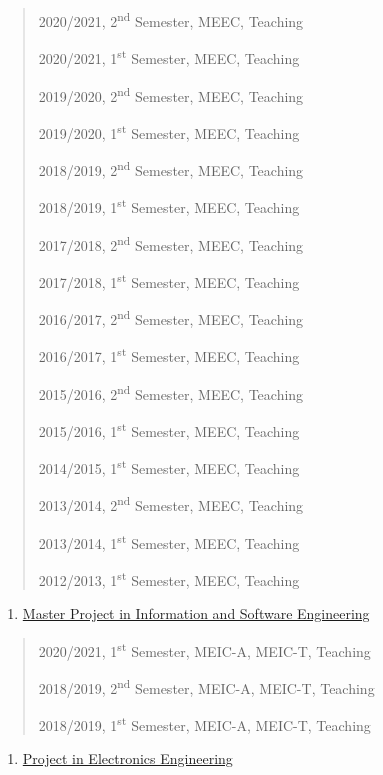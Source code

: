 \begin{quote}
2020/2021, 2\textsuperscript{nd} Semester, MEEC, Teaching

2020/2021, 1\textsuperscript{st} Semester, MEEC, Teaching

2019/2020, 2\textsuperscript{nd} Semester, MEEC, Teaching

2019/2020, 1\textsuperscript{st} Semester, MEEC, Teaching

2018/2019, 2\textsuperscript{nd} Semester, MEEC, Teaching

2018/2019, 1\textsuperscript{st} Semester, MEEC, Teaching

2017/2018, 2\textsuperscript{nd} Semester, MEEC, Teaching

2017/2018, 1\textsuperscript{st} Semester, MEEC, Teaching

2016/2017, 2\textsuperscript{nd} Semester, MEEC, Teaching

2016/2017, 1\textsuperscript{st} Semester, MEEC, Teaching

2015/2016, 2\textsuperscript{nd} Semester, MEEC, Teaching

2015/2016, 1\textsuperscript{st} Semester, MEEC, Teaching

2014/2015, 1\textsuperscript{st} Semester, MEEC, Teaching

2013/2014, 2\textsuperscript{nd} Semester, MEEC, Teaching

2013/2014, 1\textsuperscript{st} Semester, MEEC, Teaching

2012/2013, 1\textsuperscript{st} Semester, MEEC, Teaching
\end{quote}

\begin{enumerate}
\def\labelenumi{\arabic{enumi}.}
\setcounter{enumi}{25}
\item
  \ul{Master Project in Information and Software Engineering}
\end{enumerate}

\begin{quote}
2020/2021, 1\textsuperscript{st} Semester, MEIC-A, MEIC-T, Teaching

2018/2019, 2\textsuperscript{nd} Semester, MEIC-A, MEIC-T, Teaching

2018/2019, 1\textsuperscript{st} Semester, MEIC-A, MEIC-T, Teaching
\end{quote}

\begin{enumerate}
\def\labelenumi{\arabic{enumi}.}
\setcounter{enumi}{26}
\item
  \ul{Project in Electronics Engineering}
\end{enumerate}

